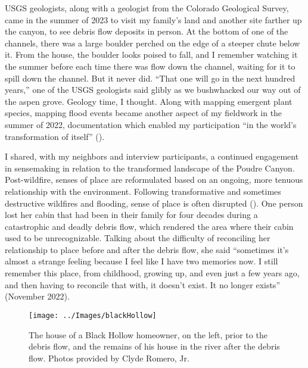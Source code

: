 \documentclass[
]{article}
\begin{document}
USGS geologists, along with a geologist from the Colorado Geological Survey, came in the summer of 2023 to visit my family's land and another site farther up the canyon, to see debris flow deposits in person. At the bottom of one of the channels, there was a large boulder perched on the edge of a steeper chute below it. From the house, the boulder looks poised to fall, and I remember watching it the summer before each time there was flow down the channel, waiting for it to spill down the channel. But it never did. ``That one will go in the next hundred years,'' one of the USGS geologists said glibly as we bushwhacked our way out of the aspen grove. Geology time, I thought. Along with mapping emergent plant species, mapping flood events became another aspect of my fieldwork in the summer of 2022, documentation which enabled my participation ``in the world's transformation of itself'' ().

I shared, with my neighbors and interview participants, a continued engagement in sensemaking in relation to the transformed landscape of the Poudre Canyon. Post-wildfire, senses of place are reformulated based on an ongoing, more tenuous relationship with the environment. Following transformative and sometimes destructive wildfires and flooding, sense of place is often disrupted (). One person lost her cabin that had been in their family for four decades during a catastrophic and deadly debris flow, which rendered the area where their cabin used to be unrecognizable. Talking about the difficulty of reconciling her relationship to place before and after the debris flow, she said ``sometimes it's almost a strange feeling because I feel like I have two memories now. I still remember this place, from childhood, growing up, and even just a few years ago, and then having to reconcile that with, it doesn't exist. It no longer exists'' (November 2022).

\begin{figure}
\texttt{[image: ../Images/blackHollow]} \caption[Black Hollow house remains]{The house of a Black Hollow homeowner, on the left, prior to the debris flow, and the remains of his house in the river after the debris flow. Photos provided by Clyde Romero, Jr.}\label{fig:figureTitle-20}
\end{figure}
\end{document}
